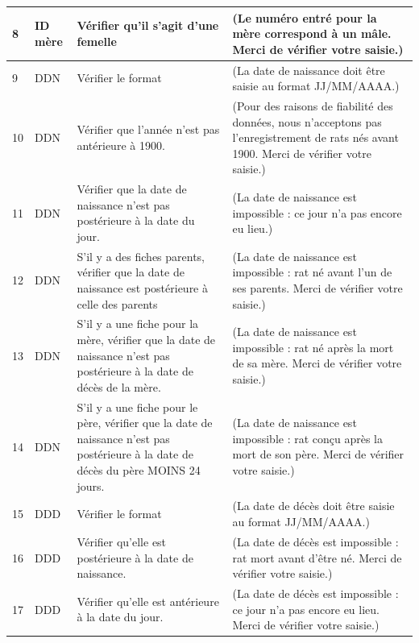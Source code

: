\documentclass[a4paper,10pt]{article}
\begin{document}
\begin{tabular}{|p{0.35cm}|p{1.35cm}|p{5cm}|p{8.5cm}|}
8 & ID mère & Vérifier qu'il s'agit d'une femelle & (Le numéro entré pour la mère correspond à un mâle. Merci de vérifier votre saisie.) \\\hline


9 & DDN & Vérifier le format & (La date de naissance doit être saisie au format JJ/MM/AAAA.)\\\hline


10 & DDN & Vérifier que l'année n'est pas antérieure à 1900. & (Pour des raisons de fiabilité des données, nous n'acceptons pas l'enregistrement de rats nés avant 1900. Merci de vérifier votre saisie.)\\\hline


11 & DDN & Vérifier que la date de naissance n'est pas postérieure à la date du jour.& (La date de naissance est impossible : ce jour n'a pas encore eu lieu.)\\\hline


12 & DDN & S'il y a des fiches parents, vérifier que la date de naissance est postérieure à celle des parents & (La date de naissance est impossible : rat né avant l'un de ses parents. Merci de vérifier votre saisie.)\\\hline


13 & DDN & S'il y a une fiche pour la mère, vérifier que la date de naissance n'est pas postérieure à la date de décès de la mère. & (La date de naissance est impossible : rat né après la mort de sa mère. Merci de vérifier votre saisie.)\\\hline


14 & DDN & S'il y a une fiche pour le père, vérifier que la date de naissance n'est pas postérieure à la date de décès du père MOINS 24 jours. & (La date de naissance est impossible : rat conçu après la mort de son père. Merci de vérifier votre saisie.)\\\hline


15 & DDD & Vérifier le format & (La date de décès doit être saisie au format JJ/MM/AAAA.)\\\hline


16 & DDD & Vérifier qu'elle est postérieure à la date de naissance. & (La date de décès est impossible : rat mort avant d'être né. Merci de vérifier votre saisie.)\\\hline


17 & DDD & Vérifier qu'elle est antérieure à la date du jour. & (La date de décès est impossible : ce jour n'a pas encore eu lieu. Merci de vérifier votre saisie.)\\\hline



\end{tabular}
\end{document}
